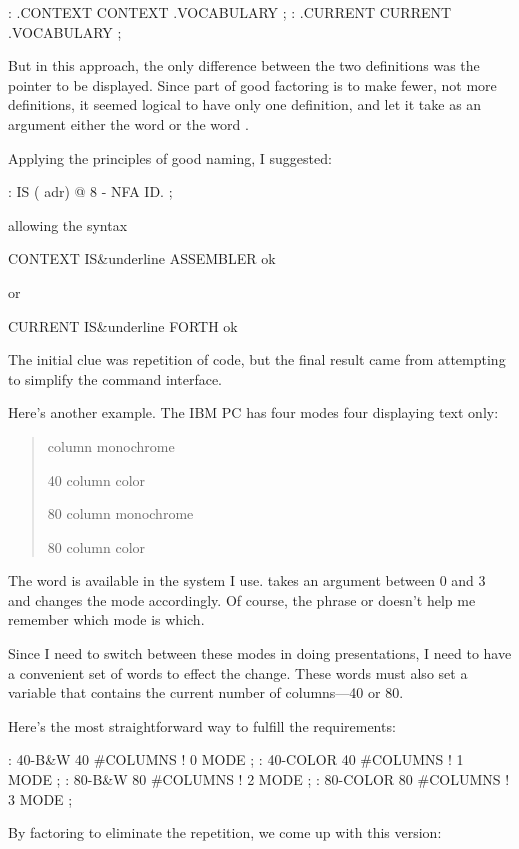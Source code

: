 \begin{Code}
: .CONTEXT   CONTEXT .VOCABULARY ;
: .CURRENT   CURRENT .VOCABULARY ;
\end{Code}
But in this approach, the only difference between the two definitions
was the pointer to be displayed. Since part of good factoring is to
make fewer, not more definitions, it seemed logical to have only one
definition, and let it take as an argument either the word
 or the word .

Applying the principles of good naming, I suggested:

\begin{Code}
: IS  ( adr)   @  8 -  NFA  ID. ;
\end{Code}
allowing the syntax

\begin{Code}[commandchars=\&\{\}]
CONTEXT IS&underline{ ASSEMBLER ok}
\end{Code}
or

\begin{Code}[commandchars=\&\{\}]
CURRENT IS&underline{ FORTH ok}
\end{Code}
The initial clue was repetition of code, but the final result came
from attempting to simplify the command interface.

Here's another example. The IBM PC has four modes four displaying text
only:

\begin{quote} column monochrome

40 column color

80 column monochrome

80 column color
\end{quote}
The word  is available in the \Forth{} system I use.
 takes an argument between 0 and 3 and changes the mode
accordingly. Of course, the phrase  or 
doesn't help me remember which mode is which.

Since I need to switch between these modes in doing presentations, I
need to have a convenient set of words to effect the change. These
words must also set a variable that contains the current number of
columns---40 or 80.

Here's the most straightforward way to fulfill the requirements:

\begin{Code}
: 40-B&W       40 #COLUMNS !  0 MODE ;
: 40-COLOR     40 #COLUMNS !  1 MODE ;
: 80-B&W       80 #COLUMNS !  2 MODE ;
: 80-COLOR     80 #COLUMNS !  3 MODE ;
\end{Code}
By factoring to eliminate the repetition, we come up with this version:

